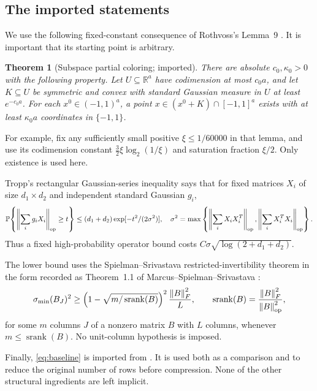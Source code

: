 \documentclass[11pt]{article}
\newtheorem{theorem}{Theorem}[section]
\theoremstyle{remark}\newtheorem{remark}[theorem]{Remark}
\newcommand{\R}{\mathbb R}\newcommand{\E}{\mathbb E}\newcommand{\Prob}{\mathbb P}
\newcommand{\norm}[1]{\left\|#1\right\|}\newcommand{\ip}[2]{\left\langle #1,#2\right\rangle}
\DeclareMathOperator{\srank}{srank}
\begin{document}
\subsection{The imported statements}
We use the following fixed-constant consequence of Rothvoss's Lemma~9 \cite{rothvoss}. It is important that its starting point is arbitrary.
\begin{theorem}[Subspace partial coloring; imported]\label{thm:pc}
There are absolute $c_0,\kappa_0>0$ with the following property. Let $U\subseteq\R^a$ have codimension at most $c_0a$, and let $K\subseteq U$ be symmetric and convex with standard Gaussian measure in $U$ at least $e^{-c_0a}$. For each $x^0\in(-1,1)^a$, a point $x\in(x^0+K)\cap[-1,1]^a$ exists with at least $\kappa_0a$ coordinates in $\{-1,1\}$.
\end{theorem}
For example, fix any sufficiently small positive $\xi\le1/60000$ in that lemma, and use its codimension constant $\frac32\xi\log_2(1/\xi)$ and saturation fraction $\xi/2$. Only existence is used here.

Tropp's rectangular Gaussian-series inequality \cite[Theorem~1.5]{tropp} says that for fixed matrices $X_i$ of size $d_1\times d_2$ and independent standard Gaussian $g_i$,
\begin{equation}\label{eq:tropp}
 \Prob\!\left\{\norm{\sum_i g_iX_i}_{\op}\ge t\right\}
 \le(d_1+d_2)\exp[-t^2/(2\sigma^2)],\quad
 \sigma^2=\max\left\{\norm{\sum_iX_iX_i^T}_{\op},\norm{\sum_iX_i^TX_i}_{\op}\right\}.
\end{equation}
Thus a fixed high-probability operator bound costs $C\sigma\sqrt{\log(2+d_1+d_2)}$.

The lower bound uses the Spielman--Srivastava restricted-invertibility theorem in the form recorded as Theorem~1.1 of Marcus--Spielman--Srivastava \cite{mss}:
\begin{equation}\label{eq:ri}
 \sigma_{\min}(B_J)^2\ge
 \left(1-\sqrt{m/\srank(B)}\right)^2\frac{\norm B_F^2}{L},
 \qquad \srank(B)=\frac{\norm B_F^2}{\norm B_{\op}^2},
\end{equation}
for some $m$ columns $J$ of a nonzero matrix $B$ with $L$ columns, whenever $m\le\srank(B)$. No unit-column hypothesis is imposed.

Finally, \eqref{eq:baseline} is imported from \cite{lmw}. It is used both as a comparison and to reduce the original number of rows before compression. None of the other structural ingredients are left implicit.
\end{document}
